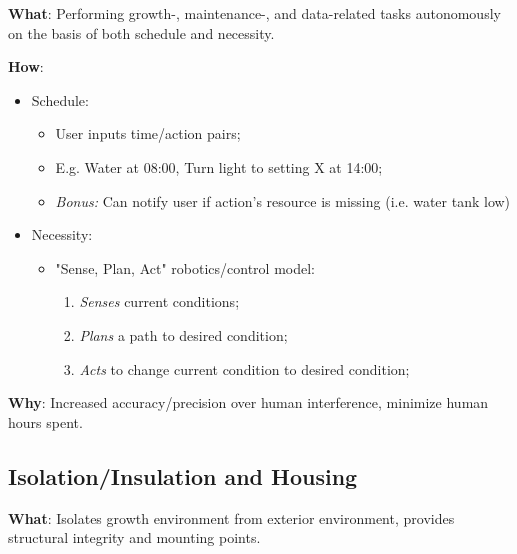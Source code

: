 \documentclass{report}
\begin{document}
\textbf{What}: Performing growth-, maintenance-, and data-related tasks autonomously on the basis of both schedule and necessity.

\textbf{How}:
\begin{itemize}
    \item Schedule:
    \begin{itemize}
        \item User inputs time/action pairs;
        \item E.g. Water at 08:00, Turn light to setting X at 14:00;
        \item \textit{Bonus:} Can notify user if action's resource is missing (i.e. water tank low)
    \end{itemize}
    \item Necessity:
    \begin{itemize}
        \item "Sense, Plan, Act" robotics/control model:
        \begin{enumerate}
            \item \textit{Senses} current conditions;
            \item \textit{Plans} a path to desired condition;
            \item \textit{Acts} to change current condition to desired condition;
        \end{enumerate}
    \end{itemize}
\end{itemize}
\textbf{Why}: Increased accuracy/precision over human interference, minimize human hours spent.

\subsection{Isolation/Insulation and Housing}
\label{sec:isolationinsulation}

\textbf{What}: Isolates growth environment from exterior environment, provides structural integrity and mounting points.
\end{document}

